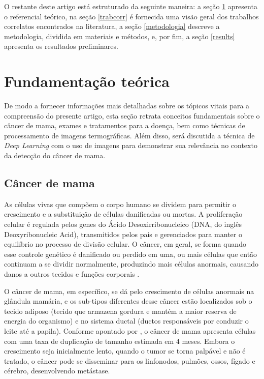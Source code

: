 O restante deste artigo está estruturado da seguinte maneira: a seção \ref{fundteorica} apresenta o referencial teórico, na seção \ref{trabcorr} é fornecida uma visão geral dos trabalhos correlatos encontrados na literatura, a seção \ref{metodologia} descreve a metodologia, dividida em materiais e métodos, e, por fim, a seção \ref{results} apresenta os resultados preliminares. 




\section{\esp Fundamentação teórica}  \label{fundteorica}

De modo a fornecer informações mais detalhadas sobre os tópicos vitais para a compreensão do presente artigo, esta seção retrata conceitos fundamentais sobre o câncer de mama, exames e tratamentos para a doença, bem como técnicas de processamento de imagens termográficas. Além disso, será discutida a técnica de \textit{Deep Learning} com o uso de imagens para demonstrar sua relevância no contexto da detecção do câncer de mama.


\subsection{\esp Câncer de mama} \label{cancerdemama}
As células vivas que compõem o corpo humano se dividem para permitir o crescimento e a substituição de células danificadas ou mortas. A proliferação celular é regulada pelos genes do Ácido Desoxirribonucleico (DNA, do inglês Deoxyribonucleic Acid), transmitidos pelos pais e gerenciados para manter o equilíbrio no processo de divisão celular. O câncer, em geral, se forma quando esse controle genético é danificado ou perdido em uma, ou mais células que então continuam a se dividir normalmente, produzindo mais células anormais, causando danos a outros tecidos e funções corporais \cite{basicOncology}.

O câncer de mama, em específico, se dá pelo crescimento de células anormais na glândula mamária, e os sub-tipos diferentes desse câncer estão localizados sob o tecido adiposo (tecido que armazena gordura e mantém a maior reserva de energia do organismo) e no sistema ductal (ductos responsáveis por conduzir o leite até a papila). Conforme apontado por , o câncer de mama apresenta células com uma taxa de duplicação de tamanho estimada em 4 meses. Embora o crescimento seja inicialmente lento, quando o tumor se torna palpável e não é tratado, o câncer pode se disseminar para os linfonodos, pulmões, ossos, fígado e cérebro, desenvolvendo metástase.

